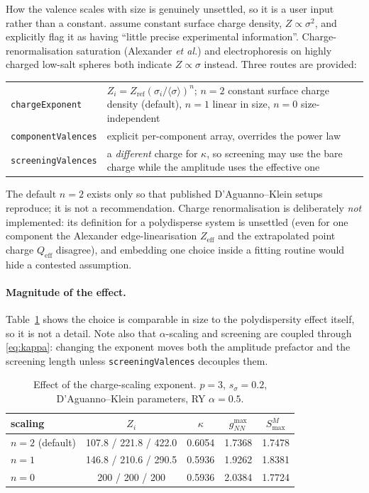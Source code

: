 \documentclass[11pt,a4paper]{article}
\newcommand{\code}[1]{\texttt{\hspace{0pt}#1}}
\begin{document}
How the valence scales with size is genuinely unsettled, so it is a user
input rather than a constant. \cite{DAguannoKlein1991} assume constant surface
charge density, $Z\propto\sigma^2$, and explicitly flag it as having ``little
precise experimental information''. Charge-renormalisation saturation
(Alexander \emph{et al.}) and electrophoresis on highly charged low-salt
spheres both indicate $Z\propto\sigma$ instead. Three routes are provided:

\begin{center}
\begin{tabular}{@{}p{}p{}@{}}
\toprule
\code{chargeExponent} & $Z_i = Z_{\text{ref}}(\sigma_i/\langle\sigma\rangle)^n$;
  $n=2$ constant surface charge density (default), $n=1$ linear in size,
  $n=0$ size-independent \\
\code{componentValences} & explicit per-component array, overrides the power law \\
\code{screeningValences} & a \emph{different} charge for $\kappa$, so screening
  may use the bare charge while the amplitude uses the effective one \\
\bottomrule
\end{tabular}
\end{center}

The default $n=2$ exists only so that published D'Aguanno--Klein setups
reproduce; it is not a recommendation. Charge renormalisation is deliberately
\emph{not} implemented: its definition for a polydisperse system is unsettled
(even for one component the Alexander edge-linearisation $Z_{\text{eff}}$ and
the extrapolated point charge $Q_{\text{eff}}$ disagree), and embedding one
choice inside a fitting routine would hide a contested assumption.

\paragraph{Magnitude of the effect.} Table~\ref{tab:charge} shows the choice
is comparable in size to the polydispersity effect itself, so it is not a
detail. Note also that $\alpha$-scaling and screening are coupled through
\eqref{eq:kappa}: changing the exponent moves both the amplitude prefactor
and the screening length unless \code{screeningValences} decouples them.

\begin{table}[htbp]
\centering
\caption{Effect of the charge-scaling exponent. $p=3$, $s_\sigma=0.2$,
D'Aguanno--Klein parameters, RY $\alpha=0.5$.}
\label{tab:charge}
\begin{tabular}{lcccc}
\toprule
scaling & $Z_i$ & $\kappa$ & $g_{NN}^{\max}$ & $S^M_{\max}$\\
\midrule
$n=2$ (default) & 107.8 / 221.8 / 422.0 & 0.6054 & 1.7368 & 1.7478\\
$n=1$           & 146.8 / 210.6 / 290.5 & 0.5936 & 1.9262 & 1.8381\\
$n=0$           & 200 / 200 / 200        & 0.5936 & 2.0384 & 1.7724\\
\bottomrule
\end{tabular}
\end{table}
\end{document}
